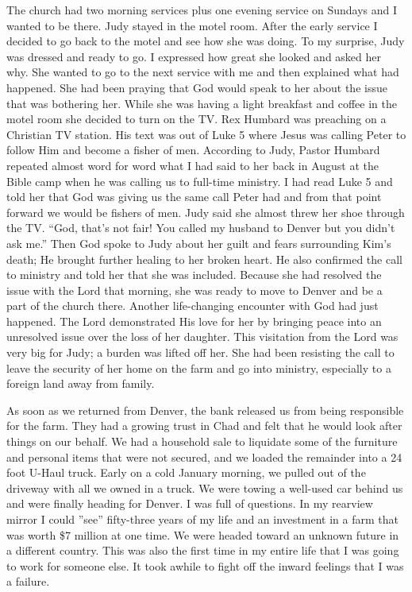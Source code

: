 \documentclass[oneside]{book}
\begin{document}
The church had two morning services plus one evening service on Sundays and I wanted to be there. Judy stayed in the motel room. After the early service I decided to go back to the motel and see how she was doing. To my surprise, Judy was dressed and ready to go. I expressed how great she looked and asked her why. She wanted to go to the next service with me and then explained what had happened. She had been praying that God would speak to her about the issue that was bothering her. While she was having a light breakfast and coffee in the motel room she decided to turn on the TV. Rex Humbard was preaching on a Christian TV station. His text was out of Luke 5 where Jesus was calling Peter to follow Him and become a fisher of men. According to Judy, Pastor Humbard repeated almost word for word what I had said to her back in August at the Bible camp when he was calling us to full-time ministry. I had read Luke 5 and told her that God was giving us the same call Peter had and from that point forward we would be fishers of men. Judy said she almost threw her shoe through the TV. “God, that’s not fair! You called my husband to Denver but you didn’t ask me.” Then God spoke to Judy about her guilt and fears surrounding Kim’s death; He brought further healing to her broken heart. He also confirmed the call to ministry and told her that she was included. Because she had resolved the issue with the Lord that morning, she was ready to move to Denver and be a part of the church there. Another life-changing encounter with God had just happened. The Lord demonstrated His love for her by bringing peace into an unresolved issue over the loss of her daughter. This visitation from the Lord was very big for Judy; a burden was lifted off her. She had been resisting the call to leave the security of her home on the farm and go into ministry, especially to a foreign land away from family.

As soon as we returned from Denver, the bank released us from being responsible for the farm. They had a growing trust in Chad and felt that he would look after things on our behalf. We had a household sale to liquidate some of the furniture and personal items that were not secured, and we loaded the remainder into a 24 foot U-Haul truck. Early on a cold January morning, we pulled out of the driveway with all we owned in a truck. We were towing a well-used car behind us and were finally heading for Denver. I was full of questions. In my rearview mirror I could ”see” fifty-three years of my life and an investment in a farm that was worth \$7 million at one time. We were headed toward an unknown future in a different country. This was also the first time in my entire life that I was going to work for someone else. It took awhile to fight off the inward feelings that I was a failure.
\end{document}
